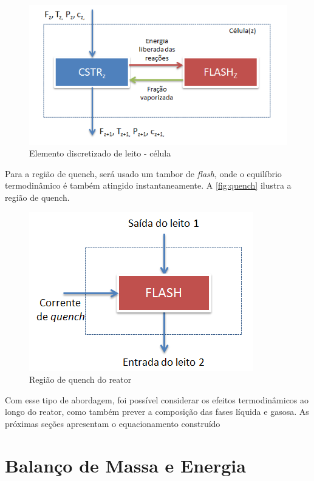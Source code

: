  \begin{figure}[htb]
 \centering \includegraphics[scale=0.75]{images/Chap3/celula.png}
 \caption{Elemento discretizado de leito - célula}
 \label{fig:celula}
 \end{figure}


Para a região de quench, será usado um tambor de \emph{flash}, onde o equilíbrio
termodinâmico é também atingido instantaneamente. A \autoref{fig:quench} ilustra
a região de quench.

 \begin{figure}[htb]
 \centering \includegraphics[scale=0.75]{images/Chap3/quench.png}
 \caption{Região de quench do reator}
 \label{fig:quench}
 \end{figure}

Com esse tipo de abordagem, foi possível considerar os efeitos termodinâmicos
ao longo do reator, como também prever a composição das fases líquida e
gasosa. As próximas seções apresentam o equacionamento construído

\section{Balanço de Massa e Energia} \label{sec:balancomassaenergia}

